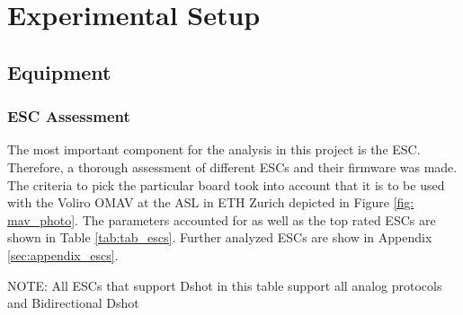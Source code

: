 \chapter{Experimental Setup}
\section{Equipment}
\subsection{ESC Assessment}
The most important component for the analysis in this project is the ESC. Therefore, a thorough assessment of different ESCs and their firmware was made. The criteria to pick the particular board took into account that it is to be used with the Voliro OMAV at the ASL in ETH Zurich depicted in Figure \ref{fig: mav_photo}. The parameters accounted for as well as the top rated ESCs are shown in Table \ref{tab:tab_escs}. Further analyzed ESCs are show in Appendix \ref{sec:appendix_escs}.

\begin{table}
\small

\begin{center}
 	\caption{ESC protocols' speeds}\vspace{1ex}
 	\label{tab:tab_escs}

\end{center}
\footnotesize{NOTE: All ESCs that support Dshot in this table support all analog protocols and Bidirectional Dshot}
\end{table}


